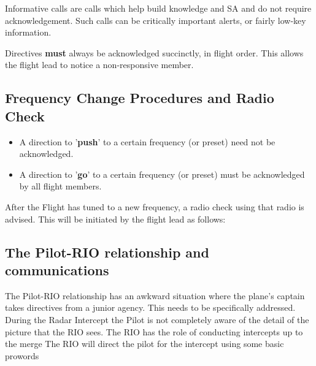 Informative calls are calls which help build knowledge and SA and do not require
acknowledgement. Such calls can be critically important alerts, or fairly
low-key information.

Directives \textbf{must} always be acknowledged succinctly, in flight order.
This allows the flight lead to notice a non-responsive member.

\subsection{Frequency Change Procedures and Radio Check}

\begin{itemize}

  \item A direction to '\textbf{push}' to a certain frequency
  (or preset) need not be acknowledged.

 \item A direction to '\textbf{go}' to a certain frequency (or
  preset) must be acknowledged by all flight members.

\end{itemize}

After the Flight has tuned to a new frequency, a radio check using that radio
is advised. This will be initiated by the flight lead as follows:


\subsection{The Pilot-RIO relationship and communications}

The Pilot-RIO relationship has an awkward situation where the plane's captain
takes directives from a junior agency. This needs to be specifically addressed.
During the Radar Intercept the Pilot is not completely aware of the detail of
the picture that the RIO sees. The RIO has the role of conducting intercepts up
to the merge The RIO will direct the pilot for the intercept using some basic
prowords

